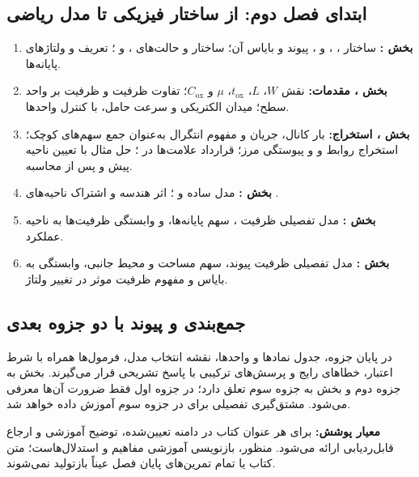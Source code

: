 \clearpage
\subsection*{ابتدای فصل دوم: از ساختار فیزیکی تا مدل ریاضی}
\begin{enumerate}
\item \textbf{بخش :} ساختار ، ،
 و ، پیوند  و بایاس آن؛
ساختار  و حالت‌های ،  و ؛
تعریف  و ولتاژهای پایانه‌ها.
\item \textbf{بخش ، مقدمات:} نقش \(W\)، \(L\)، \(t_{\mathrm{ox}}\)،
\(\mu\) و \(C_{\mathrm{ox}}\)؛ تفاوت ظرفیت و ظرفیت بر واحد سطح؛
میدان الکتریکی و سرعت حامل، با کنترل واحدها.
\item \textbf{بخش ، استخراج:} بار کانال، جریان  و
مفهوم انتگرال به‌عنوان جمع سهم‌های کوچک؛ استخراج روابط  و
 و پیوستگی مرز؛ قرارداد علامت‌ها در ؛
حل مثال با تعیین ناحیه پیش و پس از محاسبه.
\item \textbf{بخش :} مدل ساده  و
؛ اثر هندسه و اشتراک ناحیه‌های .
\item \textbf{بخش :} مدل تفصیلی ظرفیت ، سهم پایانه‌ها،
 و وابستگی ظرفیت‌ها به ناحیه عملکرد.
\item \textbf{بخش :} مدل تفصیلی ظرفیت پیوند، سهم مساحت و محیط جانبی،
وابستگی به بایاس و مفهوم ظرفیت موثر در تغییر ولتاژ.
\end{enumerate}

\subsection*{جمع‌بندی و پیوند با دو جزوه بعدی}
در پایان جزوه، جدول نمادها و واحدها، نقشه انتخاب مدل، فرمول‌ها همراه با شرط اعتبار،
خطاهای رایج و پرسش‌های ترکیبی با پاسخ تشریحی قرار می‌گیرند.
بخش  به جزوه دوم و بخش  به جزوه سوم تعلق دارد؛ در جزوه اول فقط
ضرورت آن‌ها معرفی می‌شود. مشتق‌گیری تفصیلی برای  در جزوه سوم
آموزش داده خواهد شد.

\textbf{معیار پوشش:} برای هر عنوان کتاب در دامنه تعیین‌شده، توضیح آموزشی و ارجاع
قابل‌ردیابی ارائه می‌شود. منظور، بازنویسی آموزشی مفاهیم و استدلال‌هاست؛
متن کتاب یا تمام تمرین‌های پایان فصل عیناً بازتولید نمی‌شوند.
